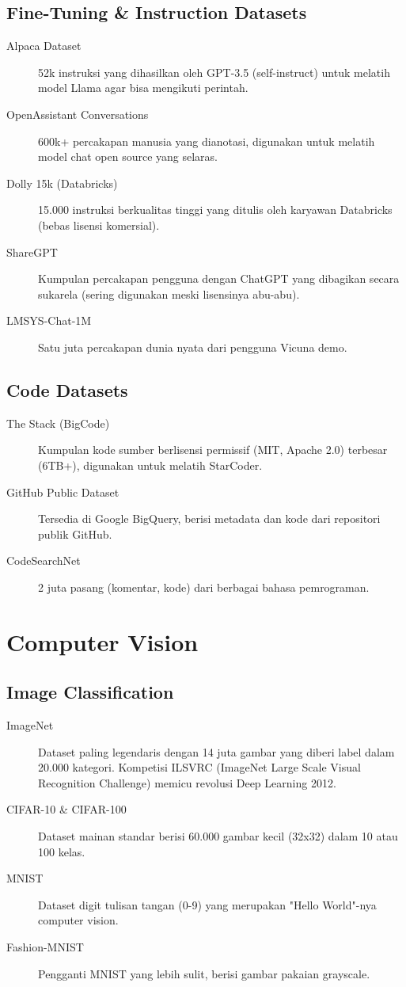 \subsection{Fine-Tuning \& Instruction Datasets}
\begin{description}
    \item[Alpaca Dataset] 52k instruksi yang dihasilkan oleh GPT-3.5 (self-instruct) untuk melatih model Llama agar bisa mengikuti perintah.
    \item[OpenAssistant Conversations] 600k+ percakapan manusia yang dianotasi, digunakan untuk melatih model chat open source yang selaras.
    \item[Dolly 15k (Databricks)] 15.000 instruksi berkualitas tinggi yang ditulis oleh karyawan Databricks (bebas lisensi komersial).
    \item[ShareGPT] Kumpulan percakapan pengguna dengan ChatGPT yang dibagikan secara sukarela (sering digunakan meski lisensinya abu-abu).
    \item[LMSYS-Chat-1M] Satu juta percakapan dunia nyata dari pengguna Vicuna demo.
\end{description}

\subsection{Code Datasets}
\begin{description}
    \item[The Stack (BigCode)] Kumpulan kode sumber berlisensi permissif (MIT, Apache 2.0) terbesar (6TB+), digunakan untuk melatih StarCoder.
    \item[GitHub Public Dataset] Tersedia di Google BigQuery, berisi metadata dan kode dari repositori publik GitHub.
    \item[CodeSearchNet] 2 juta pasang (komentar, kode) dari berbagai bahasa pemrograman.
\end{description}

\section{Computer Vision}

\subsection{Image Classification}
\begin{description}
    \item[ImageNet] Dataset paling legendaris dengan 14 juta gambar yang diberi label dalam 20.000 kategori. Kompetisi ILSVRC (ImageNet Large Scale Visual Recognition Challenge) memicu revolusi Deep Learning 2012.
    \item[CIFAR-10 \& CIFAR-100] Dataset mainan standar berisi 60.000 gambar kecil (32x32) dalam 10 atau 100 kelas.
    \item[MNIST] Dataset digit tulisan tangan (0-9) yang merupakan "Hello World"-nya computer vision.
    \item[Fashion-MNIST] Pengganti MNIST yang lebih sulit, berisi gambar pakaian grayscale.
\end{description}

